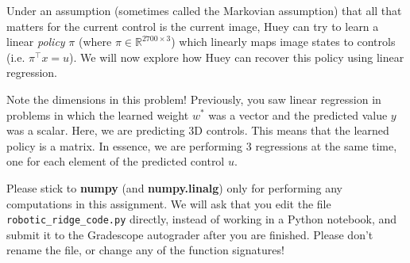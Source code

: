 \documentclass{article}
\begin{document}
Under an assumption (sometimes called the Markovian assumption) that all that matters for the current control is the current image, Huey can try to learn a linear \emph{policy} $\pi$ (where $\pi \in \mathbb{R}^{2700\times 3}$) which linearly maps image states to controls (i.e. $\pi^\top x =u$). We will now explore how Huey can recover this policy using linear regression. 

Note the dimensions in this problem! Previously, you saw linear regression in problems in which the learned weight $w^*$ was a vector and the predicted value $y$ was a scalar. Here, we are predicting 3D controls. This means that the learned policy is a matrix. In essence, we are performing $3$ regressions at the same time, one for each element of the predicted control $u$. 

Please stick to {\bf numpy} (and {\bf numpy.linalg}) only for performing any computations in this assignment. We will ask that you edit the file \texttt{robotic\_ridge\_code.py} directly, instead of working in a Python notebook, and submit it to the Gradescope autograder after you are finished. Please don't rename the file, or change any of the function signatures!
\end{document}

